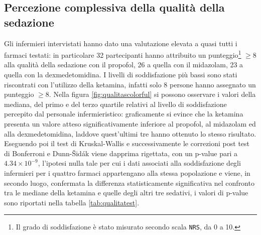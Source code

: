 \subsection*{Percezione complessiva della qualità della sedazione}
Gli infermieri intervistati hanno dato una valutazione elevata a quasi tutti i farmaci testati: in particolare 32 partecipanti hanno attribuito un punteggio\footnote{Il grado di soddisfazione è stato misurato secondo scala \texttt{NRS}, da 0 a 10.} $\geq8$ alla qualità della sedazione con il propofol, 26 a quella con il midazolam, 23 a quella con la dexmedetomidina. I livelli di soddisfazione più bassi sono stati riscontrati con l'utilizzo della ketamina, infatti solo 8 persone hanno assegnato un punteggio $\geq8$. Nella figura \ref{fig:qualitascolorful} si possono osservare i valori della mediana, del primo e del terzo quartile relativi al livello di soddisfazione percepito dal personale infermieristico: graficamente si evince che la ketamina presenta un valore atteso significativamente inferiore al propofol, al midazolam ed alla dexmedetomidina, laddove quest'ultimi tre hanno ottenuto lo stesso risultato. Eseguendo poi il test di Kruskal-Wallis e successivamente le correzioni post test di Bonferroni e Dunn-Šidák viene dapprima rigettata, con un p-value pari a $4.34\times10^{-9}$, l'ipotesi nulla tale per cui i dati associati alla soddisfazione degli infermieri per i quattro farmaci appartengano alla stessa popolazione e viene, in secondo luogo, confermata la differenza statisticamente significativa nel confronto tra le mediane della ketamina e quelle degli altri tre sedativi, i valori di p-value sono riportati nella tabella \ref{tab:qualitatest}. 


